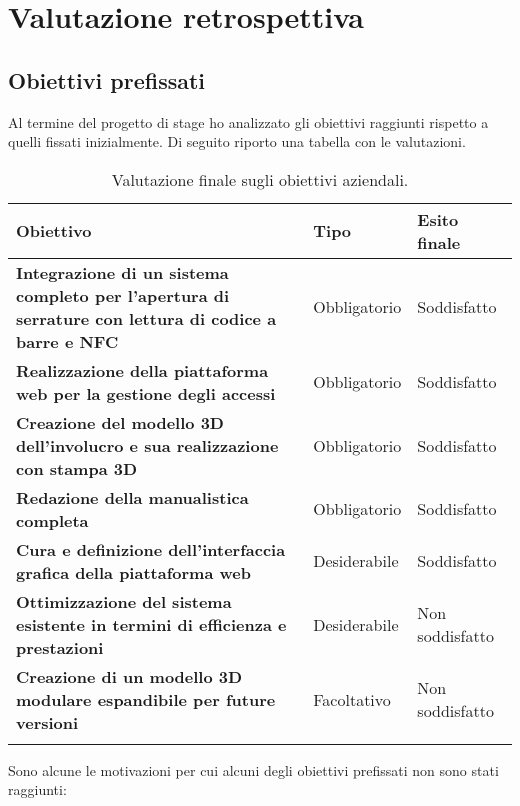 
\chapter{Valutazione retrospettiva}
\label{cap:valutazione-retrospettiva}

\section{Obiettivi prefissati}
Al termine del progetto di stage ho analizzato gli obiettivi raggiunti rispetto a quelli fissati inizialmente. Di seguito riporto una tabella con le valutazioni.

\renewcommand{\arraystretch}{1.4}
\begin{longtable}{|p{7cm}|p{2.5cm}|p{3cm}|}
\hline
\textbf{Obiettivo} & \textbf{Tipo} & \textbf{Esito finale} \\ 
\hline
\textbf{Integrazione di un sistema completo per l'apertura di serrature con lettura di codice a barre e NFC} & Obbligatorio & Soddisfatto \\ 
\hline
\textbf{Realizzazione della piattaforma web per la gestione degli accessi} & Obbligatorio & Soddisfatto \\ 
\hline
\textbf{Creazione del modello 3D dell'involucro e sua realizzazione con stampa 3D} & Obbligatorio & Soddisfatto \\ 
\hline
\textbf{Redazione della manualistica completa} & Obbligatorio & Soddisfatto \\ 
\hline
\textbf{Cura e definizione dell'interfaccia grafica della piattaforma web} & Desiderabile & Soddisfatto \\ 
\hline
\textbf{Ottimizzazione del sistema esistente in termini di efficienza e prestazioni} & Desiderabile & Non soddisfatto \\ 
\hline
\textbf{Creazione di un modello 3D modulare espandibile per future versioni} & Facoltativo & Non soddisfatto \\ 
\hline
\caption{Valutazione finale sugli obiettivi aziendali.}
\end{longtable}

Sono alcune le motivazioni per cui alcuni degli obiettivi prefissati non sono stati raggiunti:

